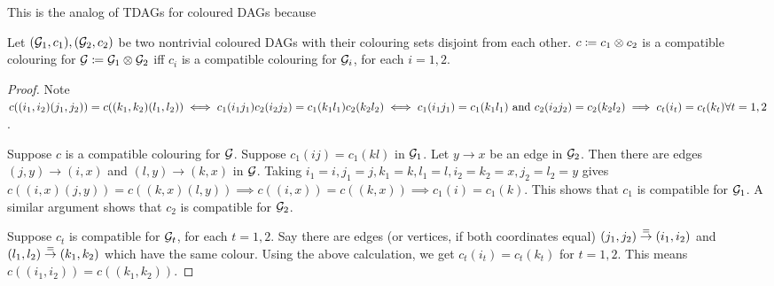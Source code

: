This is the analog of TDAGs for coloured DAGs because 
\begin{prop}
Let $({\mathcal{G}}_1,c_1), ({\mathcal{G}}_2,c_2)$ be two nontrivial coloured DAGs with their colouring sets disjoint from each other. $c\coloneqq c_1\otimes c_2$ is a compatible colouring for ${\mathcal{G}}\coloneqq {\mathcal{G}}_1\otimes {\mathcal{G}}_2$ iff $c_i$ is a compatible colouring for ${\mathcal{G}}_i$, for each $i=1,2$.
\end{prop}

\begin{proof}
Note $c((i_1,i_2)(j_1,j_2)) = c((k_1,k_2)(l_1,l_2)) \iff c_1(i_1j_1)c_2(i_2j_2) = c_1(k_1l_1)c_2(k_2l_2) \\\iff c_1(i_1j_1) = c_1(k_1l_1) \text{ and } c_2(i_2j_2) = c_2(k_2l_2)\implies c_t(i_t)=c_t(k_t)\forall t=1,2$.

Suppose $c$ is a compatible colouring for ${\mathcal{G}}$. Suppose $c_1(ij) = c_1(kl)$ in ${\mathcal{G}}_1$. Let $y\to x$ be an edge in ${\mathcal{G}}_2$. Then there are edges $(j,y)\to (i,x)$ and $(l,y)\to (k,x)$ in ${\mathcal{G}}$. Taking $i_1=i, j_1=j, k_1=k, l_1=l, i_2=k_2=x, j_2=l_2=y$ gives $c((i,x)(j,y)) = c((k,x)(l,y)) \implies c((i,x)) = c((k,x))\implies c_1(i) = c_1(k)$. This shows that $c_1$ is compatible for ${\mathcal{G}}_1$. A similar argument shows that $c_2$ is compatible for ${\mathcal{G}}_2$.

Suppose $c_t$ is compatible for ${\mathcal{G}}_t$, for each $t=1,2$. Say there are edges (or vertices, if both coordinates equal) $(j_1,j_2)\stackrel{=}{\to} (i_1,i_2)$ and $(l_1,l_2)\stackrel{=}{\to}(k_1,k_2)$ which have the same colour. Using the above calculation, we get $c_t(i_t) = c_t(k_t)$ for $t=1,2$. This means $c((i_1,i_2)) = c((k_1,k_2))$.
\hfill\end{proof}

